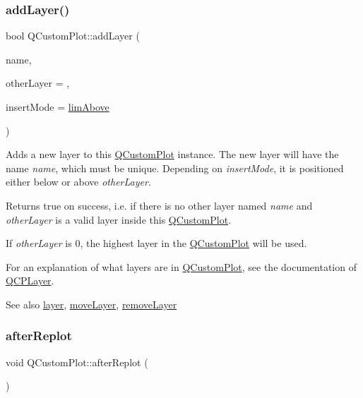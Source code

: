 \subsubsection{\texorpdfstring{addLayer()}{addLayer()}}
{\footnotesize\ttfamily bool Q\+Custom\+Plot\+::add\+Layer (\begin{DoxyParamCaption}\item[{const Q\+String \&}]{name,  }\item[{\mbox{\hyperlink{class_q_c_p_layer}{Q\+C\+P\+Layer}} $\ast$}]{other\+Layer = {},  }\item[{\mbox{\hyperlink{class_q_custom_plot_a75a8afbe6ef333b1f3d47abb25b9add7}{Q\+Custom\+Plot\+::\+Layer\+Insert\+Mode}}}]{insert\+Mode = {\ttfamily \mbox{\hyperlink{class_q_custom_plot_a75a8afbe6ef333b1f3d47abb25b9add7a062b0b7825650b432a713c0df6742d41}{lim\+Above}}} }\end{DoxyParamCaption})}

Adds a new layer to this \mbox{\hyperlink{class_q_custom_plot}{Q\+Custom\+Plot}} instance. The new layer will have the name {\itshape name}, which must be unique. Depending on {\itshape insert\+Mode}, it is positioned either below or above {\itshape other\+Layer}.

Returns true on success, i.\+e. if there is no other layer named {\itshape name} and {\itshape other\+Layer} is a valid layer inside this \mbox{\hyperlink{class_q_custom_plot}{Q\+Custom\+Plot}}.

If {\itshape other\+Layer} is 0, the highest layer in the \mbox{\hyperlink{class_q_custom_plot}{Q\+Custom\+Plot}} will be used.

For an explanation of what layers are in \mbox{\hyperlink{class_q_custom_plot}{Q\+Custom\+Plot}}, see the documentation of \mbox{\hyperlink{class_q_c_p_layer}{Q\+C\+P\+Layer}}.

\begin{DoxySeeAlso}{See also}
\mbox{\hyperlink{class_q_custom_plot_a0a96244e7773b242ef23c32b7bdfb159}{layer}}, \mbox{\hyperlink{class_q_custom_plot_ae896140beff19424e9e9e02d6e331104}{move\+Layer}}, \mbox{\hyperlink{class_q_custom_plot_a40f75e342c5eaab6a86066a42a0e2a94}{remove\+Layer}} 
\end{DoxySeeAlso}
\mbox{\label{class_q_custom_plot_a6f4fa624af060bc5919c5f266cf426a0}} 
\subsubsection{\texorpdfstring{afterReplot}{afterReplot}}
{\footnotesize\ttfamily void Q\+Custom\+Plot\+::after\+Replot (\begin{DoxyParamCaption}{ }\end{DoxyParamCaption})\hspace{0.3cm}{\ttfamily [signal]}}

